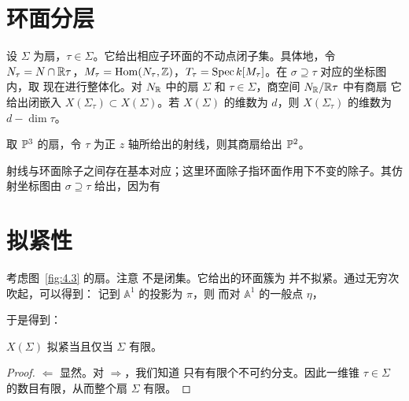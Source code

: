 \section{环面分层}
设 $\Sigma$ 为扇，$\tau\in\Sigma$。它给出相应子环面的不动点闭子集。具体地，令 $N_\tau=N\cap\mathbb R\tau$，$M_\tau=\operatorname{Hom}(N_\tau,\mathbb Z)$，$T_\tau=\operatorname{Spec} k[M_\tau]$。在 $\sigma\supseteq\tau$ 对应的坐标图内，取
现在进行整体化。对 $N_{\mathbb R}$ 中的扇 $\Sigma$ 和 $\tau\in\Sigma$，商空间 $N_{\mathbb R}/\mathbb R\tau$ 中有商扇
它给出闭嵌入 $X(\Sigma_\tau)\subset X(\Sigma)$。若 $X(\Sigma)$ 的维数为 $d$，则 $X(\Sigma_\tau)$ 的维数为 $d-\dim\tau$。
\begin{example}\label{ex:4.13}
取 $\mathbb P^3$ 的扇，令 $\tau$ 为正 $z$ 轴所给出的射线，则其商扇给出 $\mathbb P^2$。
\end{example}
射线与环面除子之间存在基本对应；这里环面除子指环面作用下不变的除子。其仿射坐标图由 $\sigma\supseteq\tau$ 给出，因为有
\section{拟紧性}
\begin{example}\label{ex:4.14}
考虑图~\ref{fig:4.3} 的扇。注意
不是闭集。它给出的环面簇为
并不拟紧。通过无穷次吹起，可以得到：
记到 $\mathbb A^1$ 的投影为 $\pi$，则
而对 $\mathbb A^1$ 的一般点 $\eta$，
\end{example}
于是得到：
\begin{proposition}\label{prop:4.8}
$X(\Sigma)$ 拟紧当且仅当 $\Sigma$ 有限。
\end{proposition}
\begin{proof}
$\Leftarrow$ 显然。对 $\Rightarrow$，我们知道
只有有限个不可约分支。因此一维锥 $\tau\in\Sigma$ 的数目有限，从而整个扇 $\Sigma$ 有限。
\end{proof}
